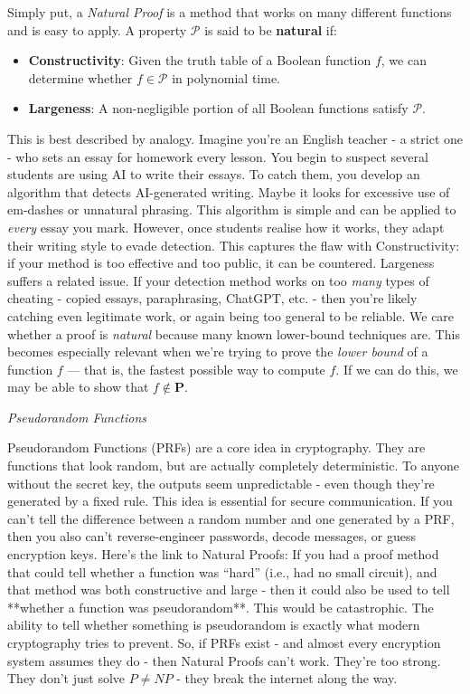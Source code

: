 \documentclass[12pt]{report}
\begin{document}
Simply put, a \textit{Natural Proof} is a method that works on many different functions and is easy to apply.  
A property $\mathcal{P}$ is said to be \textbf{natural} if:
\begin{itemize}
    \item \textbf{Constructivity}: Given the truth table of a Boolean function $f$, we can determine whether $f \in \mathcal{P}$ in polynomial time.
    \item \textbf{Largeness}: A non-negligible portion of all Boolean functions satisfy $\mathcal{P}$.
\end{itemize}
This is best described by analogy.  
Imagine you're an English teacher - a strict one - who sets an essay for homework every lesson. You begin to suspect several students are using AI to write their essays.  
To catch them, you develop an algorithm that detects AI-generated writing. Maybe it looks for excessive use of em-dashes or unnatural phrasing.
This algorithm is simple and can be applied to \textit{every} essay you mark.  
However, once students realise how it works, they adapt their writing style to evade detection.  
This captures the flaw with Constructivity: if your method is too effective and too public, it can be countered.
Largeness suffers a related issue. If your detection method works on too \textit{many} types of cheating - copied essays, paraphrasing, ChatGPT, etc. - then you're likely catching even legitimate work, or again being too general to be reliable.
\vspace{1cm}
\newline
We care whether a proof is \textit{natural} because many known lower-bound techniques are.  
This becomes especially relevant when we're trying to prove the \textit{lower bound} of a function $f$ — that is, the fastest possible way to compute $f$.  
If we can do this, we may be able to show that $f \notin \mathbf{P}$.

\begin{center}
    \vspace{0cm}
    {\Large\itshape Pseudorandom Functions\par}
\end{center}
Pseudorandom Functions (PRFs) are a core idea in cryptography.  
They are functions that look random, but are actually completely deterministic.  
To anyone without the secret key, the outputs seem unpredictable - even though they're generated by a fixed rule.
This idea is essential for secure communication.  
If you can't tell the difference between a random number and one generated by a PRF, then you also can't reverse-engineer passwords, decode messages, or guess encryption keys.
Here's the link to Natural Proofs:  
If you had a proof method that could tell whether a function was “hard” (i.e., had no small circuit), and that method was both constructive and large - then it could also be used to tell **whether a function was pseudorandom**.
This would be catastrophic. 
The ability to tell whether something is pseudorandom is exactly what modern cryptography tries to prevent.
So, if PRFs exist - and almost every encryption system assumes they do - then Natural Proofs can't work.  
They're too strong.  
They don't just solve $P \neq NP$ - they break the internet along the way.
\end{document}

